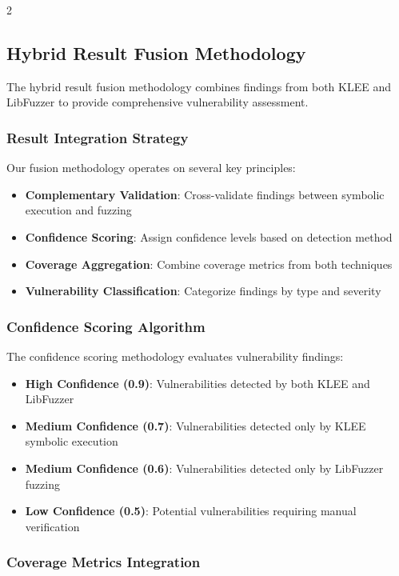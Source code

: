 \documentclass[12pt,a4paper]{article}
\begin{document}
\begin{multicols}{2}
\subsection{Hybrid Result Fusion Methodology}

The hybrid result fusion methodology combines findings from both KLEE and LibFuzzer to provide comprehensive vulnerability assessment.

\subsubsection{Result Integration Strategy}

Our fusion methodology operates on several key principles:

\begin{itemize}
    \item \textbf{Complementary Validation}: Cross-validate findings between symbolic execution and fuzzing
    \item \textbf{Confidence Scoring}: Assign confidence levels based on detection method
    \item \textbf{Coverage Aggregation}: Combine coverage metrics from both techniques
    \item \textbf{Vulnerability Classification}: Categorize findings by type and severity
\end{itemize}

\subsubsection{Confidence Scoring Algorithm}

The confidence scoring methodology evaluates vulnerability findings:

\begin{itemize}
    \item \textbf{High Confidence (0.9)}: Vulnerabilities detected by both KLEE and LibFuzzer
    \item \textbf{Medium Confidence (0.7)}: Vulnerabilities detected only by KLEE symbolic execution
    \item \textbf{Medium Confidence (0.6)}: Vulnerabilities detected only by LibFuzzer fuzzing
    \item \textbf{Low Confidence (0.5)}: Potential vulnerabilities requiring manual verification
\end{itemize}

\subsubsection{Coverage Metrics Integration}


\end{multicols}
\end{document}
